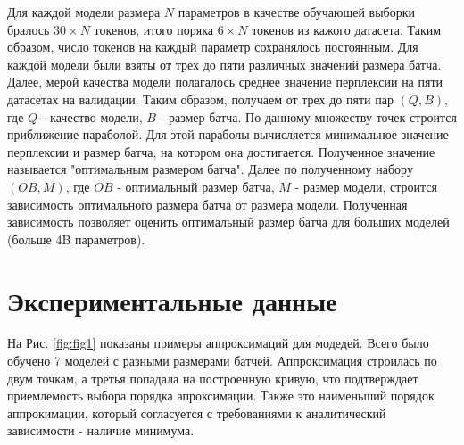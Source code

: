 \documentclass{article}
\begin{document}
Для каждой модели размера $N$ параметров в качестве обучающей выборки бралось $30 \times N$ токенов, итого поряка $6 \times N$ токенов из кажого датасета. Таким образом, число токенов на каждый параметр сохранялось постоянным. Для каждой модели были взяты от трех до пяти различных значений размера батча. Далее, мерой качества модели полагалось среднее значение перплексии на пяти датасетах на валидации. Таким образом, получаем от трех до пяти пар $(Q, B)$, где $Q$ - качество модели, $B$ - размер батча. По данному множеству точек строится приближение параболой. Для этой параболы вычисляется минимальное значение перплексии и размер батча, на котором она достигается. Полученное значение называется "оптимальным размером батча". Далее по полученному набору $(OB, M)$, где $OB$ - оптимальный размер батча, $M$ - размер модели, строится зависимость оптимального размера батча от размера модели. Полученная зависимость позволяет оценить оптимальный размер батча для больших моделей (больше 4B параметров). 
\section{Экспериментальные данные}
На Рис. \ref{fig:fig1} показаны примеры аппроксимаций для модедей. Всего было обучено 7 моделей с разными размерами батчей. Аппроксимация строилась по двум точкам, а третья попадала на построенную кривую, что подтверждает приемлемость выбора порядка апроксимации. Также это наименьший порядок аппрокимации, который согласуется с требованиями к аналитический зависимости - наличие минимума. 
\end{document}
